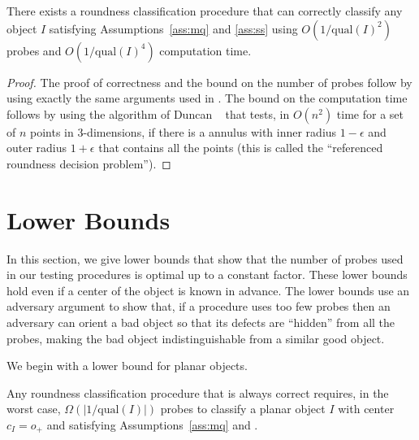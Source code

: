 \documentclass[11pt]{article}
\newcommand{\origin}{o_+}
\newcommand{\qual}{\mathrm{qual}}
\begin{document}
\begin{thm}
There exists a roundness classification procedure that can correctly
classify any object $I$ satisfying Assumptions~\ref{ass:mq} and
\ref{ass:ss} using $O(1/\qual(I)^2)$ probes and 
$O(1/\qual(I)^4)$ computation time.
\end{thm}

\begin{proof}
The proof of correctness and the bound on the number of probes follow
by using exactly the same arguments used in .  The bound
on the computation time follows by using the algorithm of Duncan
\etal\ \cite{dgr97} that tests, in $O(n^2)$ time for a set of $n$
points in 3-dimensions, if there is a annulus with inner radius
$1-\epsilon$ and outer radius $1+\epsilon$ that contains all the
points (this is called the ``referenced roundness decision problem'').
\end{proof}



\section{Lower Bounds}

In this section, we give lower bounds that show that the number of
probes used in our testing procedures is optimal up to a constant
factor.  These lower bounds hold even if a center of the object is
known in advance.  The lower bounds use an adversary argument to show
that, if a procedure uses too few probes then an adversary can orient
a bad object so that its defects are ``hidden'' from all the probes,
making the bad object indistinguishable from a similar good object.

We begin with a lower bound for planar objects.

\begin{thm}
Any roundness classification procedure that is always correct
requires, in the worst case, $\Omega(|1/\qual(I)|)$ probes to classify
a planar object $I$ with center $c_I=\origin$ and satisfying
Assumptions~\ref{ass:mq} and .
\end{thm}
\end{document}
